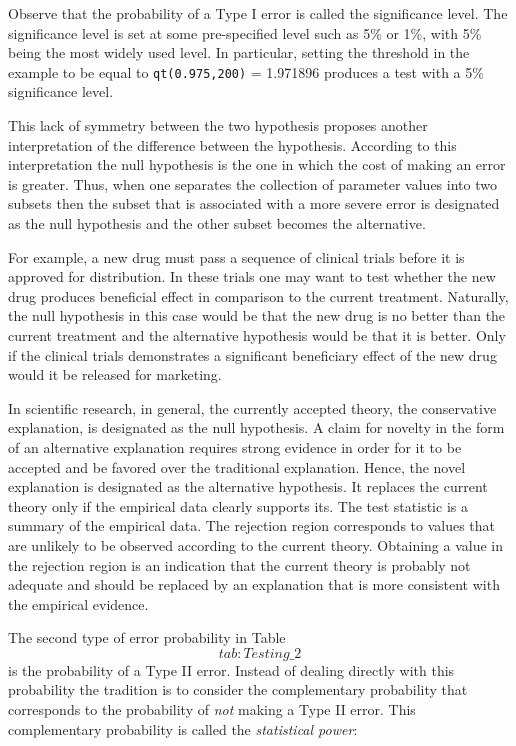 \documentclass[]{krantz}
\theoremstyle{definition}
\theoremstyle{definition}
\theoremstyle{definition}
\theoremstyle{remark}
\begin{document}
Observe that the probability of a Type I error is called the
significance level. The significance level is set at some pre-specified
level such as 5\% or 1\%, with 5\% being the most widely used level. In
particular, setting the threshold in the example to be equal to
\texttt{qt(0.975,200)} = 1.971896 produces a test with a 5\% significance level.

This lack of symmetry between the two hypothesis proposes another
interpretation of the difference between the hypothesis. According to
this interpretation the null hypothesis is the one in which the cost of
making an error is greater. Thus, when one separates the collection of
parameter values into two subsets then the subset that is associated
with a more severe error is designated as the null hypothesis and the
other subset becomes the alternative.

For example, a new drug must pass a sequence of clinical trials before
it is approved for distribution. In these trials one may want to test
whether the new drug produces beneficial effect in comparison to the
current treatment. Naturally, the null hypothesis in this case would be
that the new drug is no better than the current treatment and the
alternative hypothesis would be that it is better. Only if the clinical
trials demonstrates a significant beneficiary effect of the new drug
would it be released for marketing.

In scientific research, in general, the currently accepted theory, the
conservative explanation, is designated as the null hypothesis. A claim
for novelty in the form of an alternative explanation requires strong
evidence in order for it to be accepted and be favored over the
traditional explanation. Hence, the novel explanation is designated as
the alternative hypothesis. It replaces the current theory only if the
empirical data clearly supports its. The test statistic is a summary of
the empirical data. The rejection region corresponds to values that are
unlikely to be observed according to the current theory. Obtaining a
value in the rejection region is an indication that the current theory
is probably not adequate and should be replaced by an explanation that
is more consistent with the empirical evidence.

The second type of error probability in Table~\[tab:Testing\_2\] is the
probability of a Type II error. Instead of dealing directly with this
probability the tradition is to consider the complementary probability
that corresponds to the probability of \emph{not} making a Type II error.
This complementary probability is called the \emph{statistical power}:
\end{document}
